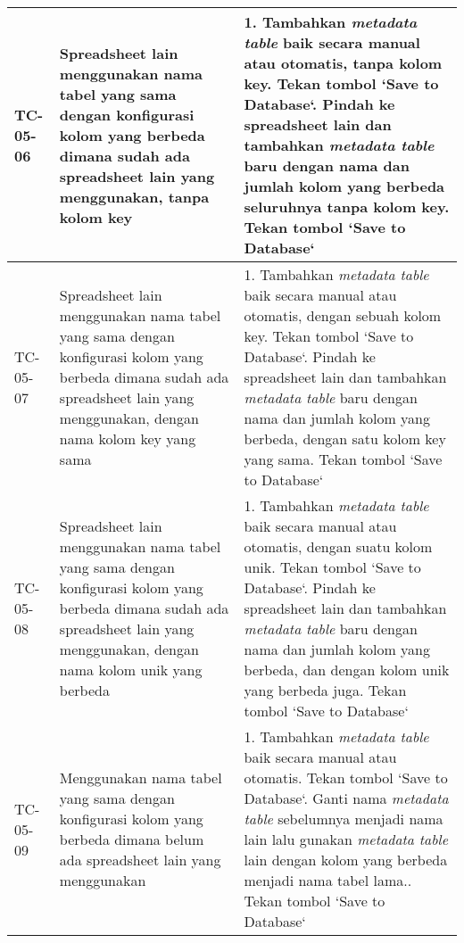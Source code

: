\begin{small}
\begin{longtable}{ | p{2cm} | p{4cm} | p{7cm} | }
	TC-05-06 & Spreadsheet lain menggunakan nama tabel yang sama dengan konfigurasi kolom yang berbeda dimana sudah ada spreadsheet lain yang menggunakan, tanpa kolom key & 1. Tambahkan \textit{metadata table} baik secara manual atau otomatis, tanpa kolom key\newline 2. Tekan tombol `Save to Database`\newline 3. Pindah ke spreadsheet lain dan tambahkan \textit{metadata table} baru dengan nama dan jumlah kolom yang berbeda seluruhnya tanpa kolom key\newline 4. Tekan tombol `Save to Database`\newline \\ \hline 
	TC-05-07 & Spreadsheet lain menggunakan nama tabel yang sama dengan konfigurasi kolom yang berbeda dimana sudah ada spreadsheet lain yang menggunakan, dengan nama kolom key yang sama & 1. Tambahkan \textit{metadata table} baik secara manual atau otomatis, dengan sebuah kolom key\newline 2. Tekan tombol `Save to Database`\newline 3. Pindah ke spreadsheet lain dan tambahkan \textit{metadata table} baru dengan nama dan jumlah kolom yang berbeda, dengan satu kolom key yang sama\newline 4. Tekan tombol `Save to Database`\newline \\ \hline 
	TC-05-08 & Spreadsheet lain menggunakan nama tabel yang sama dengan konfigurasi kolom yang berbeda dimana sudah ada spreadsheet lain yang menggunakan, dengan nama kolom unik yang berbeda & 1. Tambahkan \textit{metadata table} baik secara manual atau otomatis, dengan suatu kolom unik\newline 2. Tekan tombol `Save to Database`\newline 3. Pindah ke spreadsheet lain dan tambahkan \textit{metadata table} baru dengan nama dan jumlah kolom yang berbeda, dan dengan kolom unik yang berbeda juga\newline 4. Tekan tombol `Save to Database`\newline \\ \hline 
	TC-05-09 & Menggunakan nama tabel yang sama dengan konfigurasi kolom yang berbeda dimana belum ada spreadsheet lain yang menggunakan & 1. Tambahkan \textit{metadata table} baik secara manual atau otomatis\newline 2. Tekan tombol `Save to Database`\newline 3. Ganti nama \textit{metadata table} sebelumnya menjadi nama lain lalu gunakan \textit{metadata table} lain dengan kolom yang berbeda menjadi nama tabel lama.\newline 4. Tekan tombol `Save to Database`\newline \\ \hline 

\end{longtable}
\end{small}
